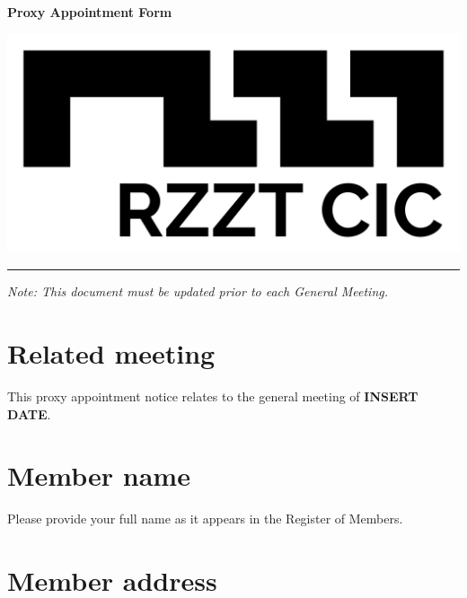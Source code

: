 \documentclass[a4paper,10pt]{article}
\begin{document}
\thispagestyle{firstpage}

\begin{Form}

\begin{minipage}[b]{0.75\textwidth}
  \raggedright
  \LARGE{\textbf{Proxy Appointment Form}}
  \vspace{0.05em}
\end{minipage}
%
\begin{minipage}[b]{0.25\textwidth}
  \raggedleft
  \includegraphics[width=1\textwidth]{logo-black.jpg}
\end{minipage}

\hrule

\vspace{2em}

\textit{Note: This document must be updated prior to each General Meeting.}

\section{Related meeting}

This proxy appointment notice relates to the general meeting of \textbf{INSERT DATE}.

\section{Member name}

Please provide your full name as it appears in the Register of Members.

\begin{framed}%
  \TextField[width=\textwidth,maxlen=75,donotscroll=true,name=forename]{ }%
\end{framed}%

\section{Member address}


\end{Form}
\end{document}
